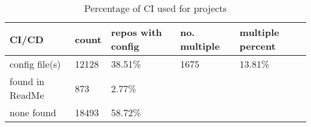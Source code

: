 
    \begin{table}[h]
\begin{tabular}{|l|l|l|l|l|}
\hline
    CI/CD & \textbf{count} & \textbf{repos with config} & \textbf{no. multiple} & \textbf{multiple percent}   \\ \hline
config file(s) &           12128     & 38.51\%                                & 1675          & 13.81\%             \\ \hline
found in ReadMe & 873     & 2.77\%                                &             &             \\ \hline
none found &            18493     & 58.72\%                                &             &             \\ \hline
\end{tabular}
\caption[Percentage of CI used for projects]{Percentage of CI used for projects}
\end{table}
    